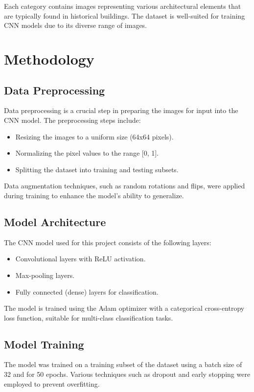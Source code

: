 \documentclass[12pt]{article}
\begin{document}
Each category contains images representing various architectural elements that are typically found in historical buildings. The dataset is well-suited for training CNN models due to its diverse range of images.

\section{Methodology}
\subsection{Data Preprocessing}
Data preprocessing is a crucial step in preparing the images for input into the CNN model. The preprocessing steps include:
\begin{itemize}
    \item Resizing the images to a uniform size (64x64 pixels).
    \item Normalizing the pixel values to the range [0, 1].
    \item Splitting the dataset into training and testing subsets.
\end{itemize}

Data augmentation techniques, such as random rotations and flips, were applied during training to enhance the model's ability to generalize.

\subsection{Model Architecture}
The CNN model used for this project consists of the following layers:
\begin{itemize}
    \item Convolutional layers with ReLU activation.
    \item Max-pooling layers.
    \item Fully connected (dense) layers for classification.
\end{itemize}

The model is trained using the Adam optimizer with a categorical cross-entropy loss function, suitable for multi-class classification tasks.

\subsection{Model Training}
The model was trained on a training subset of the dataset using a batch size of 32 and for 50 epochs. Various techniques such as dropout and early stopping were employed to prevent overfitting. 
\end{document}
